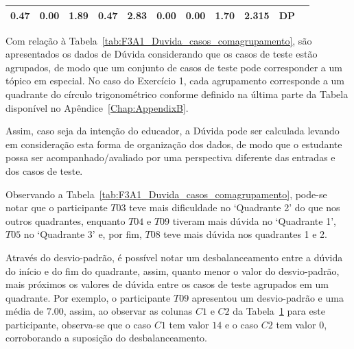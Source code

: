 \begin{table}[htbp]
\begin{tabular}{|ccccccccccc|}
		\multicolumn{1}{c|}{\cellcolor[HTML]{D9D9D9}0.47} &
		\multicolumn{1}{c|}{\cellcolor[HTML]{D9D9D9}0.00} &
		\multicolumn{1}{c|}{\cellcolor[HTML]{D9D9D9}1.89} &
		\multicolumn{1}{c|}{\cellcolor[HTML]{D9D9D9}0.47} &
		\multicolumn{1}{c|}{\cellcolor[HTML]{D9D9D9}2.83} &
		\multicolumn{1}{c|}{\cellcolor[HTML]{D9D9D9}0.00} &
		\multicolumn{1}{c|}{\cellcolor[HTML]{D9D9D9}0.00} &
		\multicolumn{1}{c|}{\cellcolor[HTML]{D9D9D9}1.70} &
		\multicolumn{1}{c|}{\cellcolor[HTML]{D9D9D9}2.315} &
		DP \\ \hline
	\end{tabular}
	\label{tab:F3A1_Duvida_casos_semagrupamento}
\end{table}

Com relação à Tabela~\ref{tab:F3A1_Duvida_casos_comagrupamento}, são apresentados os dados de Dúvida considerando que os casos de teste estão agrupados, de modo que um conjunto de casos de teste pode corresponder a um tópico em especial. No caso do Exercício 1, cada agrupamento corresponde a um quadrante do círculo trigonométrico conforme definido na última parte da Tabela disponível no Apêndice~\ref{Chap:AppendixB}. 

Assim, caso seja da intenção do educador, a Dúvida pode ser calculada levando em consideração esta forma de organização dos dados, de modo que o estudante possa ser acompanhado/avaliado por uma perspectiva diferente das entradas e dos casos de teste.

Observando a Tabela~\ref{tab:F3A1_Duvida_casos_comagrupamento}, pode-se notar que o participante $T03$ teve mais dificuldade no `Quadrante 2' do que nos outros quadrantes, enquanto $T04$ e $T09$ tiveram mais dúvida no `Quadrante 1', $T05$ no `Quadrante 3' e, por fim, $T08$ teve mais dúvida nos quadrantes 1 e 2.

Através do desvio-padrão, é possível notar um desbalanceamento entre a dúvida do início e do fim do quadrante, assim, quanto menor o valor do desvio-padrão, mais próximos os valores de dúvida entre os casos de teste agrupados em um quadrante. Por exemplo, o participante $T09$ apresentou um desvio-padrão e uma média de $7.00$, assim, ao observar as colunas $C1$ e $C2$ da Tabela~\ref{tab:F3A1_Duvida_casos_semagrupamento} para este participante, observa-se que o caso $C1$ tem valor $14$ e o caso $C2$ tem valor $0$, corroborando a suposição do desbalanceamento.


